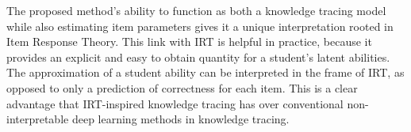 The proposed method's ability to function as both a knowledge tracing model while also estimating item parameters gives it a unique interpretation rooted in Item Response Theory. This link with IRT is helpful in practice, because it provides an explicit and easy to obtain quantity for a student's latent abilities. The approximation of a student ability can be interpreted in the frame of IRT, as opposed to only a prediction of correctness for each item. This is a clear advantage that IRT-inspired knowledge tracing has over conventional non-interpretable deep learning methods in knowledge tracing.

